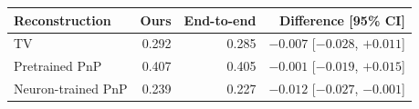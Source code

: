 \begin{tabular}{lrrr}
\toprule
Reconstruction & Ours & End-to-end & Difference [95\% CI] \\
\midrule
TV & 0.292 & 0.285 & $-0.007$ [$-0.028$, $+0.011$] \\
Pretrained PnP & 0.407 & 0.405 & $-0.001$ [$-0.019$, $+0.015$] \\
Neuron-trained PnP & 0.239 & 0.227 & $-0.012$ [$-0.027$, $-0.001$] \\
\bottomrule
\end{tabular}
